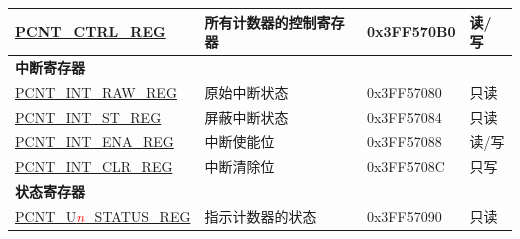 \begin{longtable}{ | l| l | l|l| }
\hyperref[regdesc:PCNTCTRLREG]{PCNT\_CTRL\_REG} & 所有计数器的控制寄存器 & 0x3FF570B0 & 读/写 \\ \hline
\multicolumn{4}{|l|}{\textbf{中断寄存器}} \\ \hline
\hyperref[regdesc:PCNTINTRAWREG]{PCNT\_INT\_RAW\_REG} & 原始中断状态 & 0x3FF57080 & 只读 \\ \hline
\hyperref[regdesc:PCNTINTSTREG]{PCNT\_INT\_ST\_REG} & 屏蔽中断状态 & 0x3FF57084 & 只读 \\ \hline
\hyperref[regdesc:PCNTINTENAREG]{PCNT\_INT\_ENA\_REG} & 中断使能位 & 0x3FF57088 & 读/写 \\ \hline
\hyperref[regdesc:PCNTINTCLRREG]{PCNT\_INT\_CLR\_REG} & 中断清除位 & 0x3FF5708C & 只写 \\ \hline

\multicolumn{4}{|l|}{\textbf{状态寄存器}} \\ \hline
\hyperref[regdesc:PCNTUnSTATUSREG]{PCNT\_U\textcolor{red}{\it{n}}\_STATUS\_REG} & 指示计数器的状态 & 0x3FF57090 & 只读  \\ \hline

\end{longtable}

